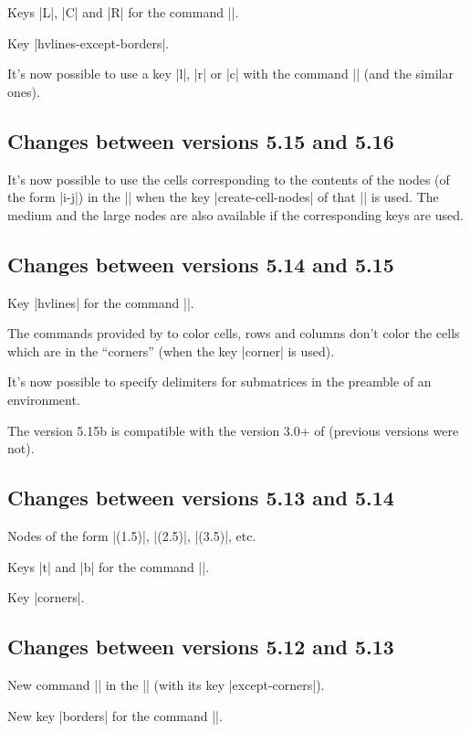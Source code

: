 \documentclass[dvipsnames]{article}%
\begin{document}
Keys |L|, |C| and |R| for the command |\Block|.

Key |hvlines-except-borders|.

It's now possible to use a key |l|, |r| or |c| with the command
|\pAutoNiceMatrix| (and the similar ones).

\subsection*{Changes between versions 5.15 and 5.16}

It's now possible to use the cells corresponding to the contents of the nodes
(of the form |i-j|) in the |\CodeBefore| when the key |create-cell-nodes| of
that |\CodeBefore| is used. The medium and the large nodes are also available
if the corresponding keys are used.

\subsection*{Changes between versions 5.14 and 5.15}

Key |hvlines| for the command |\Block|.

The commands provided by  to color cells, rows and columns
don't color the cells which are in the ``corners'' (when the key |corner| is
used).

It's now possible to specify delimiters for submatrices in the preamble of an
environment. 

The version 5.15b is compatible with the version 3.0+ of 
(previous versions were not).

\subsection*{Changes between versions 5.13 and 5.14}

Nodes of the form |(1.5)|, |(2.5)|, |(3.5)|, etc. 

Keys |t| and |b| for the command |\Block|.

Key |corners|. 

\subsection*{Changes between versions 5.12 and 5.13}

New command |\arraycolor| in the |\CodeBefore| (with its key
|except-corners|).

New key |borders| for the command |\Block|.
\end{document}
